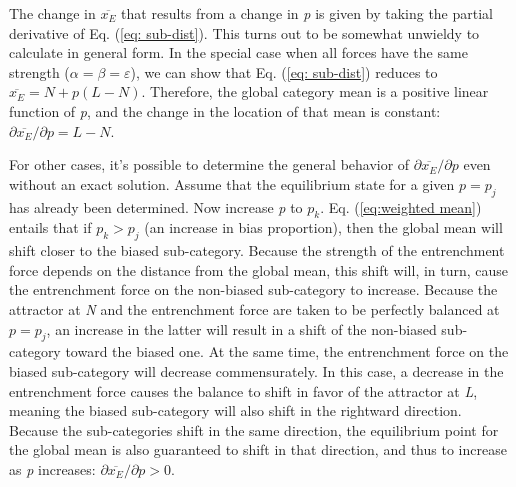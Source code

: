 The change in $\overline{x_{E}}$ that results from a change in \emph{p}
is given by taking the partial derivative of Eq. (\ref{eq: sub-dist}).
This turns out to be somewhat unwieldy to calculate in general form.
In the special case when all forces have the same strength ($\alpha=\beta=\varepsilon$),
we can show that Eq. (\ref{eq: sub-dist}) reduces to $\overline{x_{E}}=N+p(L-N)$.
Therefore, the global category mean is a positive linear function
of \emph{p}, and the change in the location of that mean is constant:
${\partial\overline{x_{E}}}/{\partial p}=L-N$. 

For other cases, it's possible to determine the general behavior of
${\partial\overline{x_{E}}}/{\partial p}$ even without an exact
solution. Assume that the equilibrium state for a given $p=p_{j}$
has already been determined. Now increase \emph{p} to $p_{k}$. Eq.
(\ref{eq:weighted mean}) entails that if $p_{k}>p_{j}$ (an increase
in bias proportion), then the global mean will shift closer to the
biased sub-category. Because the strength of the entrenchment force
depends on the distance from the global mean, this shift will, in
turn, cause the entrenchment force on the non-biased sub-category
to increase. Because the attractor at \emph{N} and the entrenchment
force are taken to be perfectly balanced at $p=p_{j}$, an increase
in the latter will result in a shift of the non-biased sub-category
toward the biased one. At the same time, the entrenchment force on
the biased sub-category will decrease commensurately. In this case,
a decrease in the entrenchment force causes the balance to shift in
favor of the attractor at \emph{L}, meaning the biased sub-category
will also shift in the rightward direction. Because the sub-categories
shift in the same direction, the equilibrium point for the global
mean is also guaranteed to shift in that direction, and thus to increase
as \emph{p} increases: ${\partial\overline{x_{E}}}/{\partial p}>0$. 

